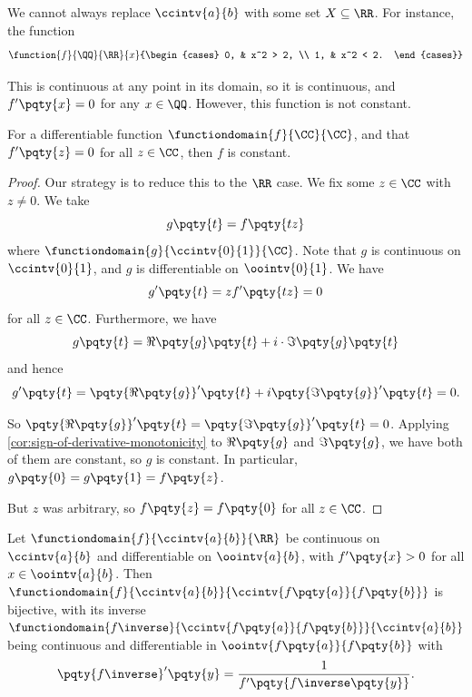 \begin{remark}
    We cannot always replace \(\ccintv{a}{b}\) with some set \(X \subseteq \RR\). For instance, the function
    \[
        \function{f}{\QQ}{\RR}{x}{\begin{cases}
            0, & x^2 > 2, \\
            1, & x^2 < 2.
        \end{cases}}
    \]

    This is continuous at any point in its domain, so it is continuous, and \(f'\pqty{x} = 0\) for any \(x \in \QQ\). However, this function is not constant.
\end{remark}

\begin{lemma}
    \label{lem:zero-derivative-constant}%
    For a differentiable function \(\functiondomain{f}{\CC}{\CC}\), and that \(f'\pqty{z} = 0\) for all \(z \in \CC\), then \(f\) is constant.
\end{lemma}

\begin{proof}
    Our strategy is to reduce this to the \(\RR\) case. We fix some \(z \in \CC\) with \(z \neq 0\). We take
    \[
        g\pqty{t} = f\pqty{tz}
    \]
    where \(\functiondomain{g}{\ccintv{0}{1}}{\CC}\). Note that \(g\) is continuous on \(\ccintv{0}{1}\), and \(g\) is differentiable on \(\oointv{0}{1}\). We have
    \[
        g'\pqty{t} = z f'\pqty{tz} = 0
    \]
    for all \(z \in \CC\). Furthermore, we have
    \[
        g\pqty{t} = \Re\pqty{g} \pqty{t} + i \cdot \Im\pqty{g} \pqty{t}
    \]
    and hence
    \[
        g'\pqty{t} = \pqty{\Re \pqty{g}}' \pqty{t} + i \pqty{\Im \pqty{g}}' \pqty{t} = 0.
    \]
    
    So \(\pqty{\Re\pqty{g}}' \pqty{t} = \pqty{\Im \pqty{g}}' \pqty{t} = 0\). Applying \autoref{cor:sign-of-derivative-monotonicity} to \(\Re\pqty{g}\) and \(\Im\pqty{g}\), we have both of them are constant, so \(g\) is constant. In particular, \(g\pqty{0} = g\pqty{1} = f\pqty{z}\).

    But \(z\) was arbitrary, so \(f\pqty{z} = f\pqty{0}\) for all \(z \in \CC\).
\end{proof}

\begin{theorem}
    \label{thm:inverse-fn-thm-differentiable}%
    Let \(\functiondomain{f}{\ccintv{a}{b}}{\RR}\) be continuous on \(\ccintv{a}{b}\) and differentiable on \(\oointv{a}{b}\), with \(f'\pqty{x} > 0\) for all \(x \in \oointv{a}{b}\). Then \(\functiondomain{f}{\ccintv{a}{b}}{\ccintv{f\pqty{a}}{f\pqty{b}}}\) is bijective, with its inverse \(\functiondomain{f\inverse}{\ccintv{f\pqty{a}}{f\pqty{b}}}{\ccintv{a}{b}}\) being continuous and differentiable in \(\oointv{f\pqty{a}}{f\pqty{b}}\) with
    \[
        \pqty{f\inverse}' \pqty{y} = \frac{1}{f'\pqty{f\inverse\pqty{y}}}.
    \] 
\end{theorem}

